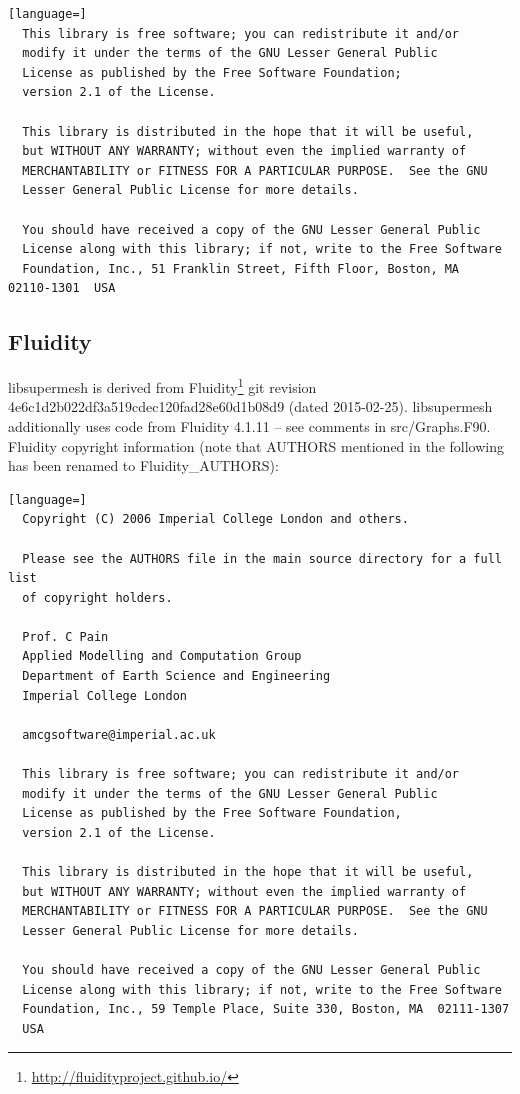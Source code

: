 \documentclass{article}
\begin{document}
\begin{lstlisting}[language=]
  This library is free software; you can redistribute it and/or
  modify it under the terms of the GNU Lesser General Public
  License as published by the Free Software Foundation;
  version 2.1 of the License.

  This library is distributed in the hope that it will be useful,
  but WITHOUT ANY WARRANTY; without even the implied warranty of
  MERCHANTABILITY or FITNESS FOR A PARTICULAR PURPOSE.  See the GNU
  Lesser General Public License for more details.

  You should have received a copy of the GNU Lesser General Public
  License along with this library; if not, write to the Free Software
  Foundation, Inc., 51 Franklin Street, Fifth Floor, Boston, MA  02110-1301  USA
\end{lstlisting}

\subsection{Fluidity}

libsupermesh is derived from
Fluidity\footnote{\url{http://fluidityproject.github.io/}} git revision
4e6c1d2b022df3a519cdec120fad28e60d1b08d9 (dated 2015-02-25). libsupermesh
additionally uses code from Fluidity 4.1.11 -- see comments in src/Graphs.F90.
Fluidity copyright information (note that AUTHORS mentioned in the following has
been renamed to Fluidity\_AUTHORS):

\begin{lstlisting}[language=]
  Copyright (C) 2006 Imperial College London and others.
  
  Please see the AUTHORS file in the main source directory for a full list
  of copyright holders.

  Prof. C Pain
  Applied Modelling and Computation Group
  Department of Earth Science and Engineering
  Imperial College London

  amcgsoftware@imperial.ac.uk
  
  This library is free software; you can redistribute it and/or
  modify it under the terms of the GNU Lesser General Public
  License as published by the Free Software Foundation,
  version 2.1 of the License.

  This library is distributed in the hope that it will be useful,
  but WITHOUT ANY WARRANTY; without even the implied warranty of
  MERCHANTABILITY or FITNESS FOR A PARTICULAR PURPOSE.  See the GNU
  Lesser General Public License for more details.

  You should have received a copy of the GNU Lesser General Public
  License along with this library; if not, write to the Free Software
  Foundation, Inc., 59 Temple Place, Suite 330, Boston, MA  02111-1307
  USA
\end{lstlisting}
\end{document}
